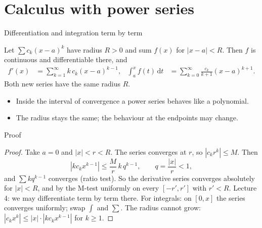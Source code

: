 \documentclass[10pt]{wosm-slides}
\newcommand{\dt}{\,\mathrm{d}t}
\begin{document}
\section{Calculus with power series}

\begin{frame}{Differentiation and integration term by term}
  \begin{theorem}
    Let $\sum c_k (x - a)^k$ have radius $R > 0$ and sum $f(x)$ for $|x - a| < R$. Then
    $f$ is continuous and differentiable there, and
    \begin{align*}
      f'(x) &= \sum_{k=1}^\infty k\, c_k (x - a)^{k-1}, &
      \int_a^x f(t)\dt &= \sum_{k=0}^\infty \frac{c_k}{k+1} (x - a)^{k+1} .
    \end{align*}
    Both new series have the same radius $R$.
  \end{theorem}
  \pause
  \begin{itemize}
    \item Inside the interval of convergence a power series behaves like a polynomial.
    \item The radius stays the same; the behaviour at the endpoints may change.
  \end{itemize}
\end{frame}

\begin{frame}{Proof}
  \begin{proof}
    Take $a = 0$ and $|x| < r < R$. The series converges at $r$, so $|c_k r^k| \le M$. Then
    \[ |k c_k x^{k-1}| \le \frac{M}{r}\, k\, q^{k-1}, \qquad q = \frac{|x|}{r} < 1 , \]
    and $\sum k q^{k-1}$ converges (ratio test).
    So the derivative series converges absolutely for $|x| < R$, and by the M-test uniformly on
    every $[-r', r']$ with $r' < R$. Lecture 4: we may differentiate term by term there.
    For integrals: on $[0, x]$ the series converges uniformly; swap $\int$ and $\sum$.
    The radius cannot grow: $|c_k x^k| \le |x| \cdot |k c_k x^{k-1}|$ for $k \ge 1$.
  \end{proof}
\end{frame}
\end{document}
